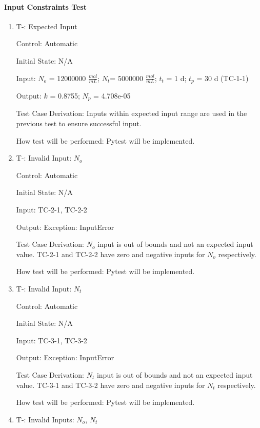 \documentclass[12pt, titlepage]{article}
\newcounter{tinnum} %
\begin{document}
\paragraph{Input Constraints Test}

\begin{enumerate}

\item{T-}\thetinnum\label{T-1}: Expected Input

Control: Automatic
					
Initial State: N/A
					
Input: $N_{o}$ = 12000000 $\frac{mol}{mL}$; $N_{t}$= 5000000 $\frac{mol}{mL}$; 
$t_{t}$ = 1 d; $t_{p}$ = 30 d (TC-1-1)
					
Output: $k$ = 0.8755; $N_p$ = 4.708e-05

Test Case Derivation: Inputs within expected input range are used in the 
previous test to ensure successful input.
					
How test will be performed: Pytest will be implemented.
					
\item{T-}\thetinnum\label{T-2}: Invalid Input: $N_{o}$

Control: Automatic
					
Initial State: N/A
					
Input: TC-2-1, TC-2-2
					
Output: Exception: InputError

Test Case Derivation: $N_{o}$ input is out of bounds and not an expected input 
value. TC-2-1 and TC-2-2 have zero and negative inputs for $N_{o}$  
respectively. 

How test will be performed: Pytest will be implemented.


\item{T-}\thetinnum\label{T-3}: Invalid Input: $N_{t}$

Control: Automatic
					
Initial State: N/A
					
Input: TC-3-1, TC-3-2
					
Output: Exception: InputError

Test Case Derivation: $N_{t}$ input is out of bounds and not an expected input 
value. TC-3-1 and TC-3-2 have zero and negative inputs for $N_{t}$ respectively. 

How test will be performed: Pytest will be implemented.


\item{T-}\thetinnum\label{T-4}: Invalid Inputs: $N_{o}$, $N_{t}$


\end{enumerate}
\end{document}
